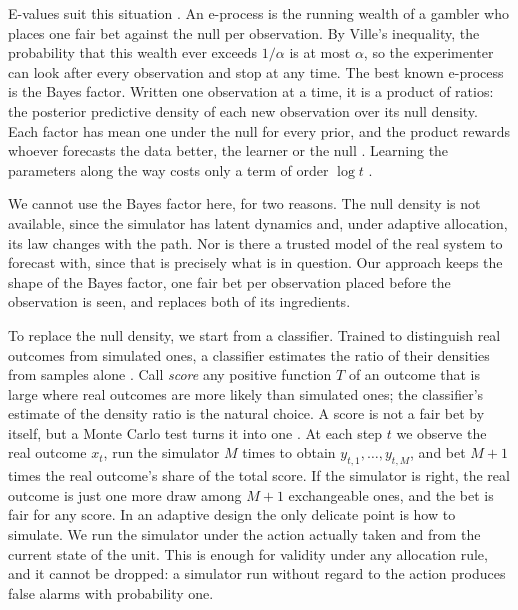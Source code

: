 \documentclass[12pt]{article}
\theoremstyle{remark}
\begin{document}
E-values suit this situation
\citep{vovk2021evalues,ramdas2023game,grunwald2024safe}. An e-process is the
running wealth of a gambler who places one fair bet against the null per
observation. By Ville's inequality, the probability that this wealth ever
exceeds $1/\alpha$ is at most $\alpha$, so the experimenter can look after
every observation and stop at any time. The best known e-process is the Bayes
factor. Written one observation at a time, it is a product of ratios: the
posterior predictive density of each new observation over its null density.
Each factor has mean one under the null for every prior, and the product
rewards whoever forecasts the data better, the learner or the null
\citep{dawid1984present}. Learning the parameters along the way costs only a
term of order $\log t$ \citep{clarke1990information}.

We cannot use the Bayes factor here, for two reasons. The null density is not
available, since the simulator has latent dynamics and, under adaptive
allocation, its law changes with the path. Nor is there a trusted model of the
real system to forecast with, since that is precisely what is in question.
Our approach keeps the shape of the Bayes factor, one fair bet per
observation placed before the observation is seen, and replaces both of its
ingredients.

To replace the null density, we start from a classifier. Trained to
distinguish real outcomes from simulated ones, a classifier estimates the
ratio of their densities from samples alone \citep{thomas2022lfire}. Call
\emph{score} any positive function $T$ of an outcome that is large where real
outcomes are more likely than simulated ones; the classifier's estimate of the
density ratio is the natural choice. A score is not a fair bet by itself, but
a Monte Carlo test turns it into one \citep{besag1989generalized}. At each
step $t$ we observe the real outcome $x_t$, run the simulator $M$ times to
obtain $y_{t,1},\dots,y_{t,M}$, and bet $M+1$ times the real outcome's share
of the total score. If the simulator is right, the real outcome is just one
more draw among $M+1$ exchangeable ones, and the bet is fair for any score. In
an adaptive design the only delicate point is how to simulate. We run the
simulator under the action actually taken and from the current state of the
unit. This is enough for validity under any allocation rule, and it cannot be
dropped: a simulator run without regard to the action produces false alarms
with probability one.
\end{document}
